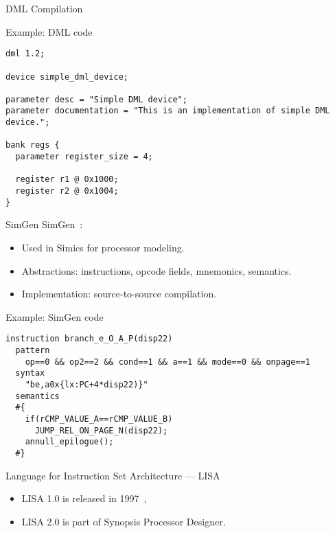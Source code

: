 \begin{frame}{DML Compilation}
  \centering
\end{frame}


\begin{frame}[fragile]{Example: DML code}
  \begin{lstlisting}
dml 1.2;

device simple_dml_device;

parameter desc = "Simple DML device";
parameter documentation = "This is an implementation of simple DML device.";

bank regs {
  parameter register_size = 4;

  register r1 @ 0x1000;
  register r2 @ 0x1004;
}
  \end{lstlisting}
\end{frame}

\begin{frame}{SimGen}
  SimGen~\cite{Larsson-SimGen}:
  \begin{itemize}
    \item Used in Simics for processor modeling.
    \item Abstractions: instructions, opcode fields, mnemonics, semantics.
    \item Implementation: source-to-source compilation.
  \end{itemize}
\end{frame}

\begin{frame}[fragile]{Example: SimGen code}
  \begin{lstlisting}
instruction branch_e_O_A_P(disp22)
  pattern
    op==0 && op2==2 && cond==1 && a==1 && mode==0 && onpage==1
  syntax
    "be,a0x{lx:PC+4*disp22)}"
  semantics
  #{
    if(rCMP_VALUE_A==rCMP_VALUE_B)
      JUMP_REL_ON_PAGE_N(disp22);
    annull_epilogue();
  #}
  \end{lstlisting}
\end{frame}

\begin{frame}{Language for Instruction Set Architecture --- LISA}
  \begin{itemize}
    \item LISA 1.0 is released in 1997~\cite{Zivojnovic-LISA},
    \item LISA 2.0 is part of Synopsis Processor Designer.
  \end{itemize}
  \vfill
  \centering
\end{frame}


